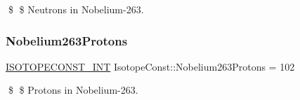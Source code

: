 \$ \$ Neutrons in Nobelium-\/263. \mbox{\label{group___isotope_const-_nobelium-_no263_ga6154b5a9ceac61e70e11601ed8ffc2dc}} 
\subsubsection{\texorpdfstring{Nobelium263\+Protons}{Nobelium263Protons}}
{\footnotesize\ttfamily \mbox{\hyperlink{group___isotope_const-_macros_ga5f18360b3e99483a35c32d789e62621c}{I\+S\+O\+T\+O\+P\+E\+C\+O\+N\+S\+T\+\_\+\+I\+NT}} Isotope\+Const\+::\+Nobelium263\+Protons = 102}

\$ \$ Protons in Nobelium-\/263. 